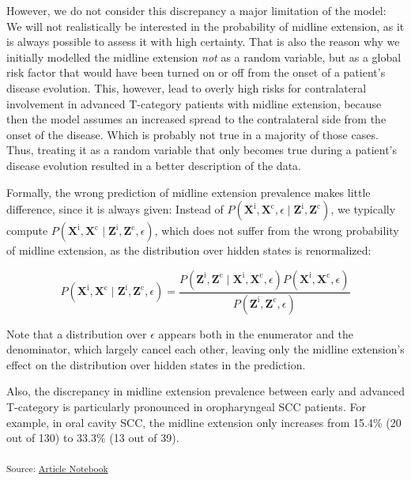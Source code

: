 \documentclass[
  sn-mathphys-num,
]{sn-jnl}
\begin{document}
However, we do not consider this discrepancy a major limitation of the
model: We will not realistically be interested in the probability of
midline extension, as it is always possible to assess it with high
certainty. That is also the reason why we initially modelled the midline
extension \emph{not} as a random variable, but as a global risk factor
that would have been turned on or off from the onset of a patient's
disease evolution. This, however, lead to overly high risks for
contralateral involvement in advanced T-category patients with midline
extension, because then the model assumes an increased spread to the
contralateral side from the onset of the disease. Which is probably not
true in a majority of those cases. Thus, treating it as a random
variable that only becomes true during a patient's disease evolution
resulted in a better description of the data.

Formally, the wrong prediction of midline extension prevalence makes
little difference, since it is always given: Instead of
\(P\left( \mathbf{X}^\text{i}, \mathbf{X}^\text{c}, \epsilon \mid \mathbf{Z}^\text{i}, \mathbf{Z}^\text{c} \right)\),
we typically compute
\(P\left( \mathbf{X}^\text{i}, \mathbf{X}^\text{c} \mid \mathbf{Z}^\text{i}, \mathbf{Z}^\text{c}, \epsilon \right)\),
which does not suffer from the wrong probability of midline extension,
as the distribution over hidden states is renormalized:

\[
P \left( \mathbf{X}^\text{i}, \mathbf{X}^\text{c} \mid \mathbf{Z}^\text{i}, \mathbf{Z}^\text{c}, \epsilon \right) = \frac{P \left( \mathbf{Z}^\text{i}, \mathbf{Z}^\text{c} \mid \mathbf{X}^\text{i}, \mathbf{X}^\text{c}, \epsilon \right) P \left( \mathbf{X}^\text{i}, \mathbf{X}^\text{c}, \epsilon \right)}{P \left( \mathbf{Z}^\text{i}, \mathbf{Z}^\text{c}, \epsilon \right)}
\]

Note that a distribution over \(\epsilon\) appears both in the
enumerator and the denominator, which largely cancel each other, leaving
only the midline extension's effect on the distribution over hidden
states in the prediction.

Also, the discrepancy in midline extension prevalence between early and
advanced T-category is particularly pronounced in oropharyngeal SCC
patients. For example, in oral cavity SCC, the midline extension only
increases from 15.4\% (20 out of 130) to 33.3\% (13 out of 39).

\textsubscript{Source:
\href{https://rmnldwg.github.io/bilateral-paper/manuscript-preview.html}{Article
Notebook}}


  
\end{document}
